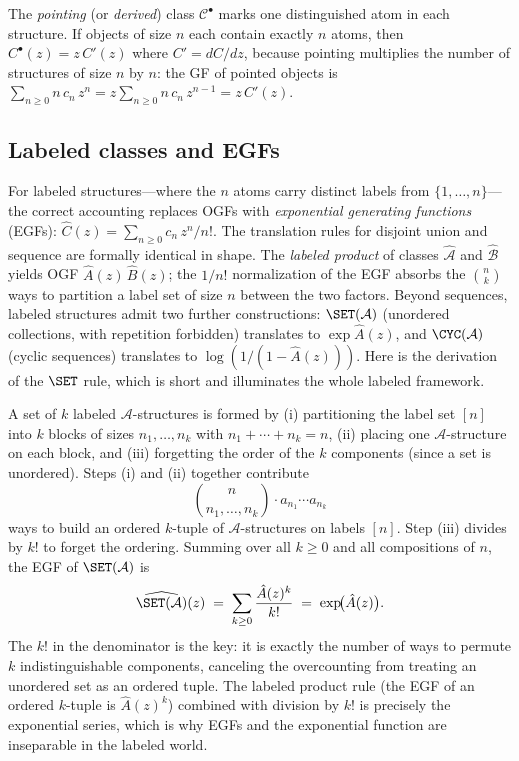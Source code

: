 The \emph{pointing} (or \emph{derived}) class $\mathcal{C}^\bullet$ marks one
distinguished atom in each structure.  If objects of size $n$ each contain exactly
$n$ atoms, then $C^\bullet(z) = z\,C'(z)$ where $C' = dC/dz$, because pointing
multiplies the number of structures of size $n$ by $n$: the GF of pointed objects
is $\sum_{n \ge 0} n\,c_n\, z^n = z \sum_{n \ge 0} n\,c_n\, z^{n-1} = z\,C'(z)$.

\subsection*{Labeled classes and EGFs}

For labeled structures---where the $n$ atoms carry distinct labels from $\{1,
\ldots, n\}$---the correct accounting replaces OGFs with \emph{exponential
generating functions} (EGFs): $\hat{C}(z) = \sum_{n \ge 0} c_n\, z^n/n!$.  The
translation rules for disjoint union and sequence are formally identical in
shape.  The \emph{labeled product} of classes $\hat{\mathcal{A}}$ and
$\hat{\mathcal{B}}$ yields OGF $\hat{A}(z)\,\hat{B}(z)$; the $1/n!$ normalization
of the EGF absorbs the $\binom{n}{k}$ ways to partition a label set of size $n$
between the two factors.  Beyond sequences, labeled structures admit two further
constructions: $\SET(\mathcal{A})$ (unordered collections, with repetition
forbidden) translates to $\exp \hat{A}(z)$, and $\CYC(\mathcal{A})$ (cyclic
sequences) translates to $\log(1/(1 - \hat{A}(z)))$.  Here is the derivation of
the $\SET$ rule, which is short and illuminates the whole labeled framework.

A set of $k$ labeled $\mathcal{A}$-structures is formed by (i) partitioning the
label set $[n]$ into $k$ blocks of sizes $n_1, \ldots, n_k$ with
$n_1 + \cdots + n_k = n$, (ii) placing one $\mathcal{A}$-structure on each block,
and (iii) forgetting the order of the $k$ components (since a set is unordered).
Steps (i) and (ii) together contribute
\[
  \binom{n}{n_1, \ldots, n_k} \cdot a_{n_1} \cdots a_{n_k}
\]
ways to build an ordered $k$-tuple of $\mathcal{A}$-structures on labels $[n]$.
Step (iii) divides by $k!$ to forget the ordering.  Summing over all $k \ge 0$
and all compositions of $n$, the EGF of $\SET(\mathcal{A})$ is
\[
  \widehat{\SET(\mathcal{A})}(z)
  \;=\; \sum_{k \ge 0} \frac{\hat{A}(z)^k}{k!}
  \;=\; \exp\!\bigl(\hat{A}(z)\bigr).
\]
The $k!$ in the denominator is the key: it is exactly the number of ways to
permute $k$ indistinguishable components, canceling the overcounting from treating
an unordered set as an ordered tuple.  The labeled product rule (the EGF of
an ordered $k$-tuple is $\hat{A}(z)^k$) combined with division by $k!$ is
precisely the exponential series, which is why EGFs and the exponential function
are inseparable in the labeled world.

